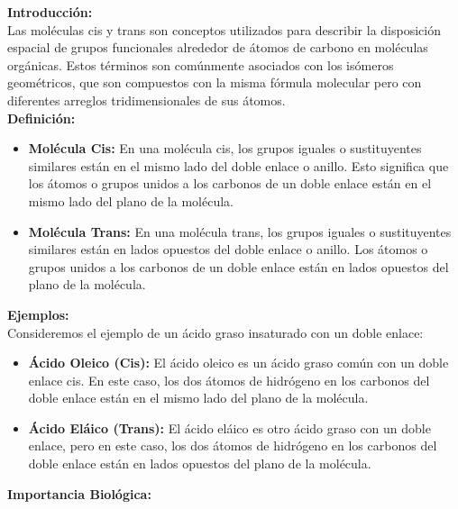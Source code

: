 
\noindent \textbf{Introducción:}\\

\noindent Las moléculas cis y trans son conceptos utilizados para describir la disposición espacial de grupos funcionales alrededor de átomos de carbono en moléculas orgánicas. Estos términos son comúnmente asociados con los isómeros geométricos, que son compuestos con la misma fórmula molecular pero con diferentes arreglos tridimensionales de sus átomos.\\

\noindent \textbf{Definición:}\\

\begin{itemize}
  \item \textbf{Molécula Cis:} En una molécula cis, los grupos iguales o sustituyentes similares están en el mismo lado del doble enlace o anillo. Esto significa que los átomos o grupos unidos a los carbonos de un doble enlace están en el mismo lado del plano de la molécula.

  \item \textbf{Molécula Trans:} En una molécula trans, los grupos iguales o sustituyentes similares están en lados opuestos del doble enlace o anillo. Los átomos o grupos unidos a los carbonos de un doble enlace están en lados opuestos del plano de la molécula.
\end{itemize}

\noindent \textbf{Ejemplos:}\\

\noindent Consideremos el ejemplo de un ácido graso insaturado con un doble enlace:\\

\begin{itemize}
  \item \textbf{Ácido Oleico (Cis):} El ácido oleico es un ácido graso común con un doble enlace cis. En este caso, los dos átomos de hidrógeno en los carbonos del doble enlace están en el mismo lado del plano de la molécula.

  \item \textbf{Ácido Eláico (Trans):} El ácido eláico es otro ácido graso con un doble enlace, pero en este caso, los dos átomos de hidrógeno en los carbonos del doble enlace están en lados opuestos del plano de la molécula.
\end{itemize}

\noindent \textbf{Importancia Biológica:} \\

